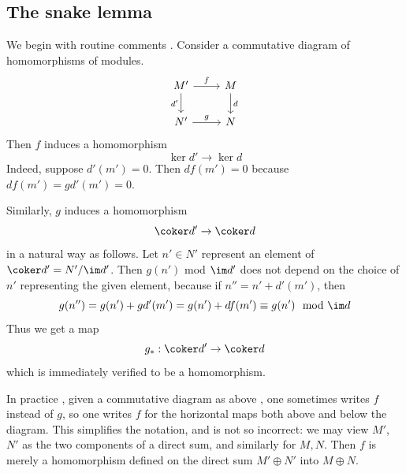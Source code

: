 \subsection{The snake lemma}
We begin with routine comments . Consider a commutative diagram of homomorphisms of modules.
\[\begin{tikzcd}
M'\ar[d,swap,"d'"]\ar[r,"f"]&M\ar[d,"d"]\\
N'\ar[r,"g"]&N
\end{tikzcd}\]
Then $f$ induces a homomorphism
\[\ker d'\to\ker d\]
Indeed, suppose $d'(m')=0$. Then $df(m')=0$ because $df(m')=gd'(m')=0$.\par
Similarly, $g$ induces a homomorphism
\[\coker d'\to\coker d\]
in a natural way as follows. Let $n'\in N'$ represent an element of $\coker d'=N'/\im d'$. Then $g(n')$ mod $\im d'$ does not depend on the choice of $n'$ representing the given element, because if $n''=n'+d'(m')$, then
\[g(n'')=g(n')+gd'(m')=g(n')+df(m')\equiv g(n')\mod \im d\]
Thus we get a map
\[g_*:\coker d'\to\coker d\]
which is immediately verified to be a homomorphism.\par
In practice , given a commutative diagram as above , one sometimes writes $f$ instead of $g$, so one writes $f$ for the horizontal maps both above and below the diagram. This simplifies the notation, and is not so incorrect: we may view $M'$, $N'$ as the two components of a direct sum, and similarly for $M, N$. Then $f$ is merely a homomorphism defined on the direct sum $M'\oplus N'$ into $M\oplus N$.\par

